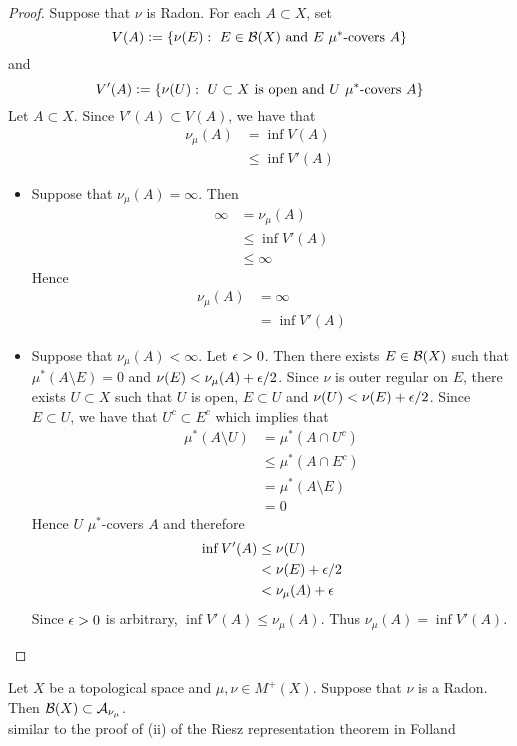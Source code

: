 \documentclass{book}
\begin{document}
	\begin{proof}
		Suppose that $\nu$ is Radon. For each $A \subset X$, set 
		$$V(A) \vcentcolon= \{\nu(E): \text{ $E \in \mathcal{B}(X)$ and $E$ $\mu^*$-covers $A$} \}$$ 
		and  
		$$V'(A) \vcentcolon= \{\nu(U): \text{ $U \subset X$ is open and $U$ $\mu^*$-covers $A$} \}$$
		Let $A \subset X$. Since $V'(A) \subset V(A)$, we have that 
		\begin{align*}
			\nu_{\mu}(A) 
			& = \inf V(A) \\
			& \leq \inf V'(A) 
		\end{align*}
		\begin{itemize}
			\item Suppose that $\nu_{\mu}(A) = \infty$. Then 
			\begin{align*}
				\infty
				& = \nu_{\mu}(A) \\
				& \leq \inf V'(A) \\
				& \leq \infty 
			\end{align*}
			Hence 
			\begin{align*}
				\nu_{\mu}(A)
				& = \infty \\
				& = \inf V'(A) 
			\end{align*}
			\item Suppose that $\nu_{\mu}(A) < \infty$. Let $\epsilon > 0$. Then there exists $E \in \mathcal{B}(X)$ such that $\mu^*(A \setminus E) = 0$ and $\nu(E) < \nu_{\mu}(A) + \epsilon/2$. Since $\nu$ is outer regular on $E$, there exists $U \subset X$ such that $U$ is open, $E \subset U$ and $\nu(U) < \nu(E) + \epsilon/2$. Since $E \subset U$, we have that $U^c \subset E^c$ which implies that 
			\begin{align*}
				\mu^*(A \setminus U)
				& = \mu^*(A \cap U^c) \\
				& \leq \mu^*(A \cap E^c) \\
				& = \mu^*(A \setminus E) \\
				& = 0
			\end{align*}
			Hence $U$ $\mu^*$-covers $A$ and therefore
			\begin{align*}
				\inf V'(A)
				& \leq \nu(U) \\
				& < \nu(E) + \epsilon/2 \\
				& < \nu_{\mu}(A) + \epsilon 
			\end{align*} 
			Since $\epsilon >0$ is arbitrary, $\inf V'(A) \leq \nu_{\mu}(A)$. Thus $\nu_{\mu}(A) = \inf V'(A)$. 
		\end{itemize}
	\end{proof}
	
	\begin{ex} 
		Let $X$ be a topological space and $\mu, \nu \in M^+(X)$. Suppose that $\nu$ is a Radon. Then $\mathcal{B}(X) \subset \mathcal{A}_{\nu_{\mu}}$. \\
		 similar to the proof of (ii) of the Riesz representation theorem in Folland
	\end{ex}
	
\end{document}

